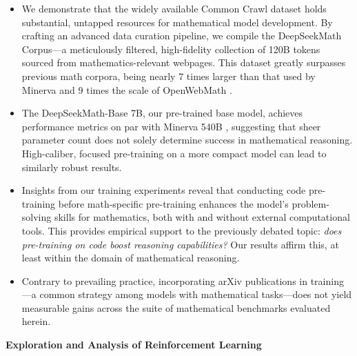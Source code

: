 \begin{itemize}[topsep=0pt]
    \item We demonstrate that the widely available Common Crawl dataset holds substantial, untapped resources for mathematical model development. By crafting an advanced data curation pipeline, we compile the DeepSeekMath Corpus—a meticulously filtered, high-fidelity collection of 120B tokens sourced from mathematics-relevant webpages. This dataset greatly surpasses previous math corpora, being nearly 7 times larger than that used by Minerva \citep{minerva} and 9 times the scale of OpenWebMath \citep{openwebmath}.
    
    \item The DeepSeekMath-Base 7B, our pre-trained base model, achieves performance metrics on par with Minerva 540B \citep{minerva}, suggesting that sheer parameter count does not solely determine success in mathematical reasoning. High-caliber, focused pre-training on a more compact model can lead to similarly robust results.

    \item Insights from our training experiments reveal that conducting code pre-training before math-specific pre-training enhances the model’s problem-solving skills for mathematics, both with and without external computational tools. This provides empirical support to the previously debated topic: \textit{does pre-training on code boost reasoning capabilities?} Our results affirm this, at least within the domain of mathematical reasoning.

    \item Contrary to prevailing practice, incorporating arXiv publications in training—a common strategy among models with mathematical tasks—does not yield measurable gains across the suite of mathematical benchmarks evaluated herein.
\end{itemize}

\textbf{Exploration and Analysis of Reinforcement Learning}

